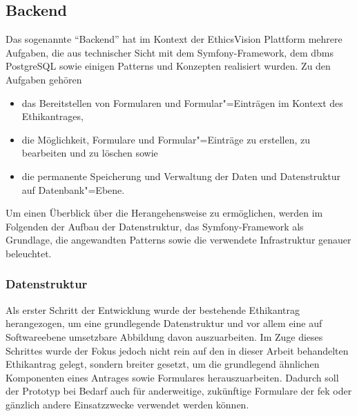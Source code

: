 \documentclass[a4paper,12pt,twoside]{scrreprt}
\begin{document}
\subsection{Backend}
\label{sub-sec:ausarbeitung-backend}

Das sogenannte \enquote{Backend} hat im Kontext der EthicsVision Plattform mehrere Aufgaben, die aus technischer Sicht mit dem Symfony-Framework, dem \ac{dbms} PostgreSQL sowie einigen Patterns und Konzepten realisiert wurden. Zu den Aufgaben gehören
\begin{itemize}
    \item das Bereitstellen von Formularen und Formular"=Einträgen im Kontext des Ethikantrages,
    \item die Möglichkeit, Formulare und Formular"=Einträge zu erstellen, zu bearbeiten und zu löschen sowie
    \item die permanente Speicherung und Verwaltung der Daten und Datenstruktur auf Datenbank"=Ebene.
\end{itemize}

Um einen Überblick über die Herangehensweise zu ermöglichen, werden im Folgenden der Aufbau der Datenstruktur, das Symfony-Framework als Grundlage, die angewandten Patterns sowie die verwendete Infrastruktur genauer beleuchtet.

\subsubsection*{Datenstruktur}
\label{sub-sub-sec:backend-datenstruktur}

Als erster Schritt der Entwicklung wurde der bestehende Ethikantrag herangezogen, um eine grundlegende Datenstruktur und vor allem eine auf Softwareebene umsetzbare Abbildung davon auszuarbeiten. Im Zuge dieses Schrittes wurde der Fokus jedoch nicht rein auf den in dieser Arbeit behandelten Ethikantrag gelegt, sondern breiter gesetzt, um die grundlegend ähnlichen Komponenten eines Antrages sowie Formulares herauszuarbeiten. Dadurch soll der Prototyp bei Bedarf auch für anderweitige, zukünftige Formulare der \ac{fek} oder gänzlich andere Einsatzzwecke verwendet werden können.
\end{document}
